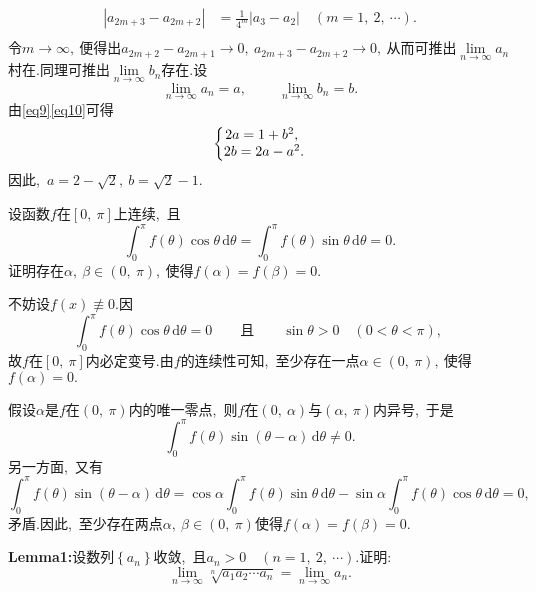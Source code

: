 \begin{solution}
\begin{align*}
			\left|a_{2m+3}-a_{2m+2}\right|&=\frac{1}{4^m}\left|a_3-a_2\right|\quad (m=1,\ 2,\ \cdots).\\
		\end{align*}
		令$m\rightarrow \infty,\ $便得出$a_{2m+2}-a_{2m+1}\rightarrow 0,\ a_{2m+3}-a_{2m+2}\rightarrow 0,\ $从而可推出$\lim\limits_{n\rightarrow \infty}a_n$村在.同理可推出$\lim\limits_{n\rightarrow\infty}b_n$存在.设
		$$\lim\limits_{n\rightarrow \infty}a_n=a,\ \qquad \lim\limits_{n\rightarrow\infty}b_n=b.$$
		由\eqref{eq9}\eqref{eq10}可得
		\begin{equation}
			\centering{
				\left\{\begin{matrix} 
					2a=1+b^2 ,\ \\ 
					2b=2a-a^2.\\  
				\end{matrix}\right. }
		\end{equation}
		因此,\ $a=2-\sqrt{2},\ b=\sqrt{2}-1.$ 
	\end{solution}
	\newpage
	\begin{problem}
		设函数$f$在$\left[0,\ \pi\right]$上连续,\ 且
		$$\int_{0}^{\pi}f(\theta)\cos \theta\, \text{d}\theta=\int_{0}^{\pi}f(\theta)\sin \theta \, \text{d}\theta=0.$$
		证明存在$\alpha,\ \beta\in (0,\ \pi),\ $使得$f(\alpha)=f(\beta)=0.$
	\end{problem}
	
	\begin{solution}
		不妨设$f(x) \not\equiv 0.$因
		$$\int_{0}^{\pi}f(\theta)\cos \theta\, \text{d}\theta=0\qquad\text{且}\qquad\sin \theta > 0\quad (0<\theta < \pi),\ $$
		故$f$在$\left[0,\ \pi\right]$内必定变号.由$f$的连续性可知,\ 至少存在一点$\alpha\in (0,\ \pi),\ $使得$f(\alpha)=0.$
		
		假设$\alpha$是$f$在$\left(0,\ \pi\right)$内的唯一零点,\ 则$f$在$\left(0,\ \alpha\right)$与$\left(\alpha,\ \pi\right)$内异号,\ 于是
		$$\int_{0}^{\pi}f(\theta)\sin(\theta -\alpha)\,\text{d}\theta \neq 0.$$
		另一方面,\ 又有
		$$\int_{0}^{\pi}f(\theta)\sin(\theta - \alpha)\,\text{d}\theta=\cos \alpha\int_{0}^{\pi}f(\theta)\sin\theta\,\text{d}\theta-\sin \alpha \int_{0}^{\pi}f(\theta)\cos \theta\,\text{d}\theta=0,\ $$
		矛盾.因此,\ 至少存在两点$\alpha,\ \beta\in (0,\ \pi)$使得$f(\alpha)=f(\beta)=0.$
	\end{solution}
	\newpage
	\begin{problem}
		\textbf{Lemma1:}设数列$\left\{a_n\right\}$收敛,\ 且$a_n>0\quad(n=1,\ 2,\ \cdots).$证明:
		$$\lim\limits_{n\rightarrow\infty}\sqrt[n]{a_1a_2\cdots a_n}=\lim\limits_{n\rightarrow\infty}a_n.$$
	\end{problem}
	
